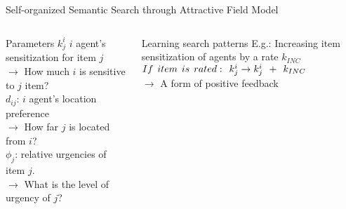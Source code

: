 \documentclass{beamer}
\begin{document}
\begin{frame}[t]{Self-organized Semantic Search through Attractive Field Model}
\begin{columns}
\begin{block}{Parameters}
\small
\alert{$k_{j}^{i}$}   $i$ agent's \alert{sensitization} for item  $j$\\
$\rightarrow$ \scriptsize How much $i$ is sensitive to $j$ item?\\
\small
\alert{$d_{ij}$:} $i$ agent's \alert{location preference}\\
$\rightarrow$ \scriptsize How far $j$ is located from $i$?\\
\small
\alert{$\phi _{j}$:} \alert{relative urgencies} of item $j$.\\
$\rightarrow$ \scriptsize What is the level of urgency of $j$?  
\end{block}

\vspace*{-0.45cm}
\begin{block}{Learning search patterns}
\small E.g.: Increasing item sensitization of agents by a rate $k_{INC}$\\
\vspace*{0.25cm}
\alert{ 
$ If\hspace*{0.15cm}item\hspace*{0.15cm}is\hspace*{0.15cm}rated:\hspace*{0.15cm}  k^i_j \rightarrow   k^i_j \hspace*{0.15cm} + \hspace*{0.15cm} k_{INC}
$ }\\
\vspace*{0.25cm}
$\rightarrow$ \scriptsize A form of \alert{positive feedback} 
\end{block}
\end{columns}
\end{frame}
\end{document}
